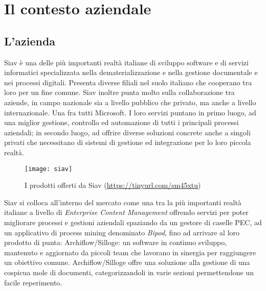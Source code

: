 
\chapter{Il contesto aziendale}
\section{L'azienda}
Siav è una delle più importanti realtà italiane di sviluppo software e di servizi informatici
specializzata nella dematerializzazione e nella gestione documentale e nei processi
digitali. Presenta diverse filiali nel suolo italiano che cooperano tra loro per un fine comune. Siav inoltre punta molto sulla collaborazione tra aziende, in campo nazionale sia a livello pubblico che privato, ma anche a livello internazionale. Una fra tutti Microsoft.
I loro servizi puntano in primo luogo, ad una miglior gestione, controllo ed automazione di tutti i principali processi aziendali; in secondo luogo, ad offrire diverse soluzioni concrete anche a singoli privati che necessitano di sistemi di gestione ed integrazione per lo loro piccola realtà.
\begin{figure}[!h] 
	\centering 
	\texttt{[image: siav]} 
	\caption{I prodotti offerti da Siav (\url{https://tinyurl.com/sm45xtu})}
\end{figure}
Siav si colloca all'interno del mercato come una tra la più importanti realtà italiane a livello di \textit{Enterprise Content Management} offrendo servizi per poter migliorare processi e gestioni aziendali spaziando da un gestore di caselle PEC, ad un applicativo di process mining denominato \textit{Bipod}, fino ad arrivare al loro prodotto di punta: Archiflow/Silloge: un software in continuo sviluppo, mantenuto e aggiornato da piccoli team che lavorano in sinergia per raggiungere un obiettivo comune. Archiflow/Silloge offre una soluzione alla gestione di una cospicua mole di documenti, categorizzandoli in varie sezioni permettendone un facile reperimento.

